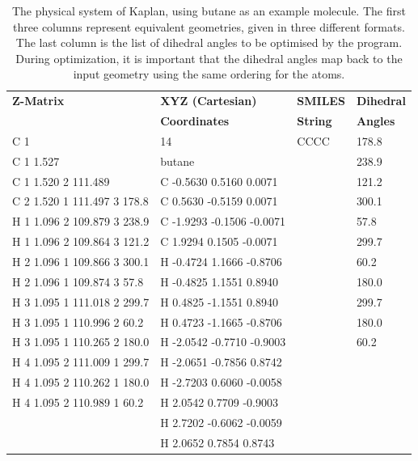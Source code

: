 \documentclass[12pt]{article}
\newcommand{\progname}{Kaplan} %
\begin{document}
\begin{table}[H]
	\begin{tabular}{llll}
		\toprule
		\textbf{Z-Matrix} & \textbf{XYZ (Cartesian)} & 
		\textbf{SMILES} & \textbf{Dihedral} \\
		& \textbf{Coordinates} & \textbf{String} & \textbf{Angles} \\
		\hline
	C   1 	&		14		&  CCCC & 178.8 \\
	C   1 1.527	&	butane  		&		& 238.9 \\
	C   1 1.520  2 111.489			& C -0.5630  0.5160  0.0071 &	& 121.2 \\
	C   2 1.520  1 111.497  3 178.8	& C  0.5630 -0.5159  0.0071	&	& 300.1 \\
	H   1 1.096  2 109.879  3 238.9	& C -1.9293 -0.1506 -0.0071	&	& 57.8 \\
	H   1 1.096  2 109.864  3 121.2	& C  1.9294  0.1505 -0.0071	&	& 299.7 \\
	H   2 1.096  1 109.866  3 300.1	& H -0.4724  1.1666 -0.8706	&	& 60.2 \\
	H   2 1.096  1 109.874  3  57.8	& H -0.4825  1.1551  0.8940	&	& 180.0 \\
	H   3 1.095  1 111.018  2 299.7	& H  0.4825 -1.1551  0.8940	&	& 299.7 \\
	H   3 1.095  1 110.996  2  60.2	& H  0.4723 -1.1665 -0.8706	&	& 180.0 \\
	H   3 1.095  1 110.265  2 180.0	& H -2.0542 -0.7710 -0.9003	&	& 60.2 \\
	H   4 1.095  2 111.009  1 299.7	& H -2.0651 -0.7856  0.8742	&	&	\\
	H   4 1.095  2 110.262  1 180.0	& H -2.7203  0.6060 -0.0058	&	&	\\
	H   4 1.095  2 110.989  1  60.2	& H  2.0542  0.7709 -0.9003	&	&	\\
									& H  2.7202 -0.6062 -0.0059	&	&	\\
									& H  2.0652  0.7854  0.8743	&	&	\\
	\bottomrule
	\end{tabular}
\caption{The physical system of \progname{}, using butane as an example 
molecule. The first three columns represent equivalent geometries, given in 
three different formats. The last column is the list of dihedral angles to be 
optimised by the program. During optimization, it is 
important that the 
dihedral angles map back to the input geometry using the same ordering for the 
atoms.}
\label{input-butane}
\end{table}
\end{document}
